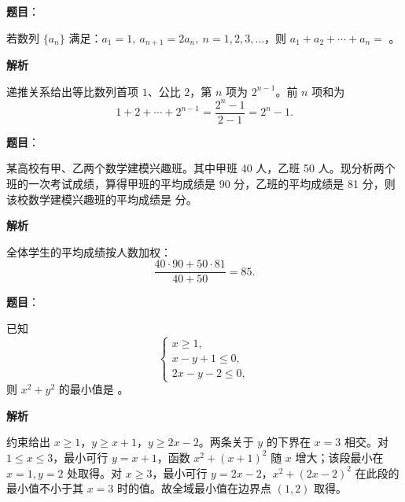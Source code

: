 \begin{answer}

\textbf{题目}：

若数列 $\{a_n\}$ 满足：$a_1=1,\ a_{n+1}=2a_n,\ n=1,2,3,\ldots$，则 $a_1+a_2+\cdots+a_n=$ \gkblank{}。

\textbf{解析}

递推关系给出等比数列首项 $1$、公比 $2$，第 $n$ 项为 $2^{n-1}$。前 $n$ 项和为
\nopagebreak[4]
\[
1+2+\cdots+2^{n-1}=\frac{2^n-1}{2-1}=2^n-1.
\]


\end{answer}
\begin{answer}

\textbf{题目}：

某高校有甲、乙两个数学建模兴趣班。其中甲班 40 人，乙班 50 人。现分析两个班的一次考试成绩，算得甲班的平均成绩是 90 分，乙班的平均成绩是 81 分，则该校数学建模兴趣班的平均成绩是 \gkblank{} 分。

\textbf{解析}

全体学生的平均成绩按人数加权：
\nopagebreak[4]
\[
\frac{40\cdot90+50\cdot81}{40+50}=85.
\]


\end{answer}
\begin{answer}

\textbf{题目}：

已知
\nopagebreak[4]
\[
\begin{cases}
x\geqslant1,\\
x-y+1\leqslant0,\\
2x-y-2\leqslant0,
\end{cases}
\]
则 $x^2+y^2$ 的最小值是 \gkblank{}。

\textbf{解析}

约束给出 $x\geqslant1$，$y\geqslant x+1$，$y\geqslant2x-2$。两条关于 $y$ 的下界在 $x=3$ 相交。对 $1\leqslant x\leqslant3$，最小可行 $y=x+1$，函数 $x^2+(x+1)^2$ 随 $x$ 增大；该段最小在 $x=1,y=2$ 处取得。对 $x\geqslant3$，最小可行 $y=2x-2$，$x^2+(2x-2)^2$ 在此段的最小值不小于其 $x=3$ 时的值。故全域最小值在边界点 $(1,2)$ 取得。


\end{answer}
